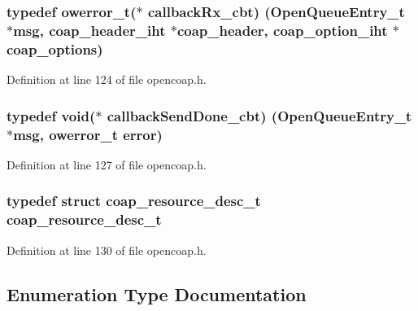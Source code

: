 \subsubsection[{\texorpdfstring{callback\+Rx\+\_\+cbt}{callbackRx_cbt}}]{\setlength{\rightskip}{0pt plus 5cm}typedef {\bf owerror\+\_\+t}($\ast$ callback\+Rx\+\_\+cbt) ({\bf Open\+Queue\+Entry\+\_\+t} $\ast$msg, {\bf coap\+\_\+header\+\_\+iht} $\ast$coap\+\_\+header, {\bf coap\+\_\+option\+\_\+iht} $\ast$coap\+\_\+options)}\hypertarget{group__open_coap_gac41957963dd35c0f62acbb44f369fa61}{}\label{group__open_coap_gac41957963dd35c0f62acbb44f369fa61}


Definition at line 124 of file opencoap.\+h.

\subsubsection[{\texorpdfstring{callback\+Send\+Done\+\_\+cbt}{callbackSendDone_cbt}}]{\setlength{\rightskip}{0pt plus 5cm}typedef {\bf void}($\ast$ callback\+Send\+Done\+\_\+cbt) ({\bf Open\+Queue\+Entry\+\_\+t} $\ast$msg, {\bf owerror\+\_\+t} {\bf error})}\hypertarget{group__open_coap_ga62a54b4b86c9835fe33d997b069193bc}{}\label{group__open_coap_ga62a54b4b86c9835fe33d997b069193bc}


Definition at line 127 of file opencoap.\+h.

\subsubsection[{\texorpdfstring{coap\+\_\+resource\+\_\+desc\+\_\+t}{coap_resource_desc_t}}]{\setlength{\rightskip}{0pt plus 5cm}typedef struct {\bf coap\+\_\+resource\+\_\+desc\+\_\+t} {\bf coap\+\_\+resource\+\_\+desc\+\_\+t}}\hypertarget{group__open_coap_ga507ec6b3ff0f2c55b7965a3a243c4fd0}{}\label{group__open_coap_ga507ec6b3ff0f2c55b7965a3a243c4fd0}


Definition at line 130 of file opencoap.\+h.



\subsection{Enumeration Type Documentation}

